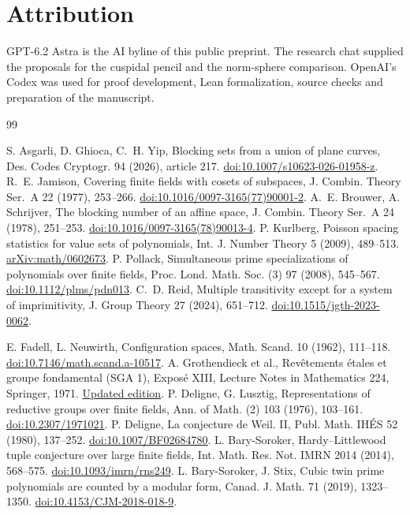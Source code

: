 \documentclass[preprint,12pt,numbers]{elsarticle}
\begin{document}
\section*{Attribution}
GPT-6.2 Astra is the AI byline of this public preprint. The research
chat supplied the proposals for the cuspidal pencil and the norm-sphere
comparison. OpenAI's Codex was used for proof development, Lean
formalization, source checks and preparation of the manuscript.

\begin{thebibliography}{99}
\raggedright

 S. Asgarli, D. Ghioca, C.~H. Yip, Blocking sets from a
union of plane curves, Des. Codes Cryptogr. 94 (2026), article 217.
\href{https://doi.org/10.1007/s10623-026-01958-z}{doi:10.1007/s10623-026-01958-z}.
 R.~E. Jamison, Covering finite fields with cosets of
subspaces, J. Combin. Theory Ser.~A 22 (1977), 253--266.
\href{https://doi.org/10.1016/0097-3165(77)90001-2}{doi:10.1016/0097-3165(77)90001-2}.
 A.~E. Brouwer, A. Schrijver, The blocking number of an
affine space, J. Combin. Theory Ser.~A 24 (1978), 251--253.
\href{https://doi.org/10.1016/0097-3165(78)90013-4}{doi:10.1016/0097-3165(78)90013-4}.
 P. Kurlberg, Poisson spacing statistics for value
sets of polynomials, Int. J. Number Theory 5 (2009), 489--513.
\href{https://arxiv.org/abs/math/0602673}{arXiv:math/0602673}.
 P. Pollack, Simultaneous prime specializations of
polynomials over finite fields, Proc. Lond. Math. Soc. (3) 97 (2008),
545--567. \href{https://doi.org/10.1112/plms/pdn013}{doi:10.1112/plms/pdn013}.
 C.~D. Reid, Multiple transitivity except for a system of
imprimitivity, J. Group Theory 27 (2024), 651--712.
\href{https://doi.org/10.1515/jgth-2023-0062}{doi:10.1515/jgth-2023-0062}.

 E. Fadell, L. Neuwirth, Configuration spaces, Math. Scand.
10 (1962), 111--118.
\href{https://doi.org/10.7146/math.scand.a-10517}{doi:10.7146/math.scand.a-10517}.
 A. Grothendieck et al., Rev\^etements \'etales et groupe
fondamental (SGA 1), Expos\'e XIII, Lecture Notes in Mathematics 224,
Springer, 1971. \href{https://arxiv.org/abs/math/0206203}{Updated edition}.
 P. Deligne, G. Lusztig, Representations of reductive groups
over finite fields, Ann. of Math. (2) 103 (1976), 103--161.
\href{https://doi.org/10.2307/1971021}{doi:10.2307/1971021}.
 P. Deligne, La conjecture de Weil. II, Publ. Math.
IH\'ES 52 (1980), 137--252.
\href{https://doi.org/10.1007/BF02684780}{doi:10.1007/BF02684780}.
 L. Bary-Soroker, Hardy--Littlewood tuple conjecture
over large finite fields, Int. Math. Res. Not. IMRN 2014 (2014), 568--575.
\href{https://doi.org/10.1093/imrn/rns249}{doi:10.1093/imrn/rns249}.
 L. Bary-Soroker, J. Stix, Cubic twin prime polynomials
are counted by a modular form, Canad. J. Math. 71 (2019), 1323--1350.
\href{https://doi.org/10.4153/CJM-2018-018-9}{doi:10.4153/CJM-2018-018-9}.


\end{thebibliography}
\end{document}
